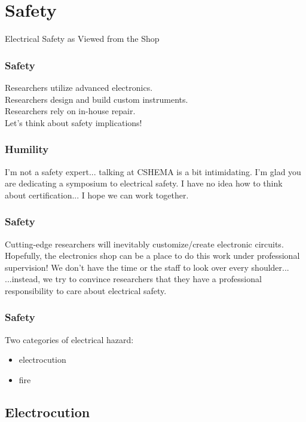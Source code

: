 \documentclass{presentation}
\begin{document}
\section{Safety}

\begin{frame}
  \huge
  Electrical Safety
  \vfill
  as Viewed from the Shop
\end{frame}

\begin{frame}\frametitle{Safety}
  Researchers utilize advanced electronics. \\
  Researchers design and build custom instruments. \\
  Researchers rely on in-house repair. \\
  \vfill{}
  Let's think about safety implications!
\end{frame}

\begin{frame}\frametitle{Humility}
  I'm not a safety expert... talking at CSHEMA is a bit intimidating.
  \vfill
  I'm glad you are dedicating a symposium to electrical safety.
  \vfill
  I have no idea how to think about certification...
  \vfill
  I hope we can work together.
\end{frame}

\begin{frame}\frametitle{Safety}
  Cutting-edge researchers will inevitably customize/create electronic circuits.
  \vfill
  Hopefully, the electronics shop can be a place to do this work under professional supervision!
  \vfill
  We don't have the time or the staff to look over every shoulder...
  ...instead, we try to convince researchers that they have a professional responsibility to care about electrical safety.
\end{frame}

\begin{frame}\frametitle{Safety}
  Two categories of electrical hazard:
  \begin{itemize}
    \item electrocution
    \item fire
  \end{itemize}
\end{frame}

\subsection{Electrocution}
\end{document}
